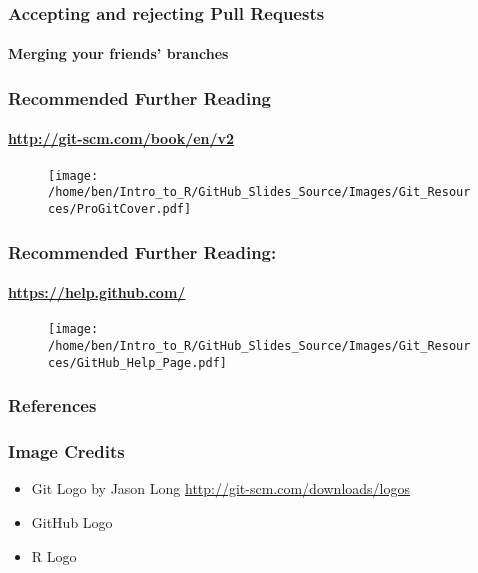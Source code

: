 \documentclass[xcolor=dvipsnames]{beamer}
\begin{document}
\begin{frame}
\frametitle{Accepting and rejecting Pull Requests}
\framesubtitle{Merging your friends' branches}
\end{frame}

\begin{frame}
\frametitle{Recommended Further Reading}
\framesubtitle{\url{http://git-scm.com/book/en/v2}}
\begin{center}
\begin{figure}
\texttt{[image: /home/ben/Intro\_to\_R/GitHub\_Slides\_Source/Images/Git\_Resources/ProGitCover.pdf]}
\end{figure}
\cite{Chacon2014}
\end{center}

\end{frame}

\begin{frame}
\frametitle{Recommended Further Reading:}
\framesubtitle{\url{https://help.github.com/}}
%
\begin{center}
\begin{figure}
\texttt{[image: /home/ben/Intro\_to\_R/GitHub\_Slides\_Source/Images/Git\_Resources/GitHub\_Help\_Page.pdf]}
\end{figure}

\end{center}

\end{frame}


\begin{frame}
\frametitle{References}


\end{frame}

\begin{frame}
\frametitle{Image Credits}
\begin{itemize}
\item Git Logo by Jason Long \url{http://git-scm.com/downloads/logos}
\item GitHub Logo 
\item R Logo
\end{itemize}
\end{frame}
\end{document}
